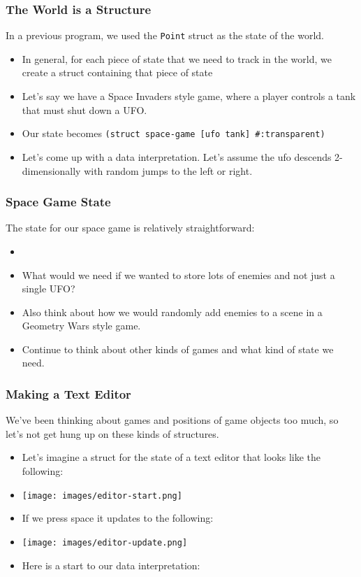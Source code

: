 \documentclass{beamer}
\begin{document}
\begin{frame}
  \frametitle{The World is a Structure}
  In a previous program, we used the \texttt{Point} struct as the
  state of the world.
  \begin{itemize}
  \item<2-> In general, for each piece of state that we need to
    track in the world, we create a struct containing that piece of state
  \item<3-> Let's say we have a Space Invaders style game, where a player
    controls a tank that must shut down a UFO.
  \item<4-> Our state becomes \texttt{(struct space-game [ufo tank] \#:transparent)}
  \item<5-> Let's come up with a data interpretation. Let's assume the ufo
    descends 2-dimensionally with random jumps to the left or right.
  \end{itemize}
\end{frame}

\begin{frame}
  \frametitle{Space Game State}
  The state for our space game is relatively straightforward:
  \begin{itemize}
  \item<2-> \SpaceGameData
  \item<3-> What would we need if we wanted to store lots of enemies and not
    just a single UFO?
  \item<4-> Also think about how we would randomly add enemies to a scene in
    a Geometry Wars style game.
  \item<5-> Continue to think about other kinds of games and what kind of
    state we need.
  \end{itemize}
\end{frame}


\begin{frame}
  \frametitle{Making a Text Editor}
  We've been thinking about games and positions of game objects
  too much, so let's not get hung up on these kinds of structures.
  \begin{itemize}
  \item<2-> Let's imagine a struct for the state of a text editor that looks
    like the following:
  \item<3-> \texttt{[image: images/editor-start.png]}
  \item<4-> If we press space it updates to the following:
  \item<5-> \texttt{[image: images/editor-update.png]}
  \item<6-> Here is a start to our data interpretation:
    \EditorState
  \end{itemize}
\end{frame}
\end{document}
